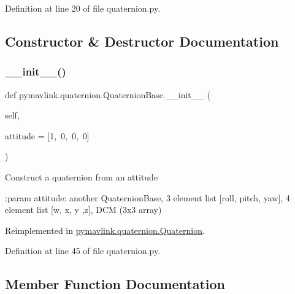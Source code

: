 Definition at line 20 of file quaternion.\+py.



\subsection{Constructor \& Destructor Documentation}
\mbox{\label{classpymavlink_1_1quaternion_1_1QuaternionBase_a6bfc9e17d697406593e6757969c36bf2}} 
\subsubsection{\texorpdfstring{\_\_init\_\_()}{\_\_init\_\_()}}
{\footnotesize\ttfamily def pymavlink.\+quaternion.\+Quaternion\+Base.\+\_\+\+\_\+init\+\_\+\+\_\+ (\begin{DoxyParamCaption}\item[{}]{self,  }\item[{}]{attitude = {\ttfamily \mbox{[}1,~0,~0,~0\mbox{]}} }\end{DoxyParamCaption})}

\begin{DoxyVerb}Construct a quaternion from an attitude

:param attitude: another QuaternionBase,
    3 element list [roll, pitch, yaw],
    4 element list [w, x, y ,z], DCM (3x3 array)
\end{DoxyVerb}
 

Reimplemented in \mbox{\hyperlink{classpymavlink_1_1quaternion_1_1Quaternion_ad82c01c2f6c5edc2e25d367624f565c5}{pymavlink.\+quaternion.\+Quaternion}}.



Definition at line 45 of file quaternion.\+py.



\subsection{Member Function Documentation}
\mbox{\label{classpymavlink_1_1quaternion_1_1QuaternionBase_acf052c96499b7df3c5d535e7e6615197}} 

